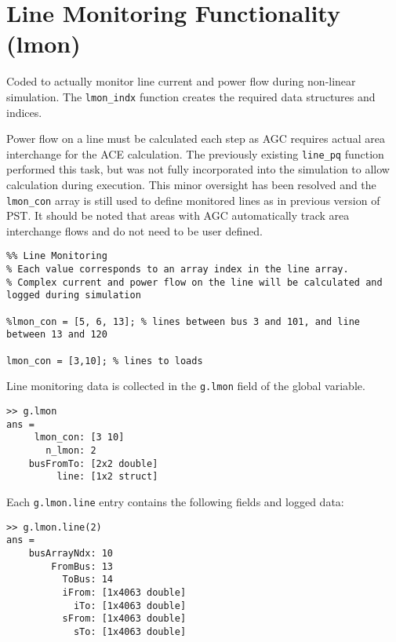 \pagebreak
\section{Line Monitoring Functionality (lmon)}  
Coded to actually monitor line current and power flow during non-linear simulation.
The \verb|lmon_indx| function creates the required data structures and indices.

 
Power flow on a line must be calculated each step as AGC requires actual area interchange for the ACE calculation.
The previously existing \verb|line_pq| function performed this task, but was not fully incorporated into the simulation to allow calculation during execution.
This minor oversight has been resolved and the \verb|lmon_con| array is still used to define monitored lines as in previous version of PST.
It should be noted that areas with AGC automatically track area interchange flows and do not need to be user defined.

\begin{verbatim}
%% Line Monitoring
% Each value corresponds to an array index in the line array.
% Complex current and power flow on the line will be calculated and logged during simulation

%lmon_con = [5, 6, 13]; % lines between bus 3 and 101, and line between 13 and 120

lmon_con = [3,10]; % lines to loads
\end{verbatim}

Line monitoring data is collected in the \verb|g.lmon| field of the global variable.

\begin{verbatim}
>> g.lmon
ans = 
     lmon_con: [3 10]
       n_lmon: 2
    busFromTo: [2x2 double]
         line: [1x2 struct]
\end{verbatim}

Each \verb|g.lmon.line| entry contains the following fields and logged data:

\begin{verbatim}
>> g.lmon.line(2)
ans = 
    busArrayNdx: 10
        FromBus: 13
          ToBus: 14
          iFrom: [1x4063 double]
            iTo: [1x4063 double]
          sFrom: [1x4063 double]
            sTo: [1x4063 double]
\end{verbatim}